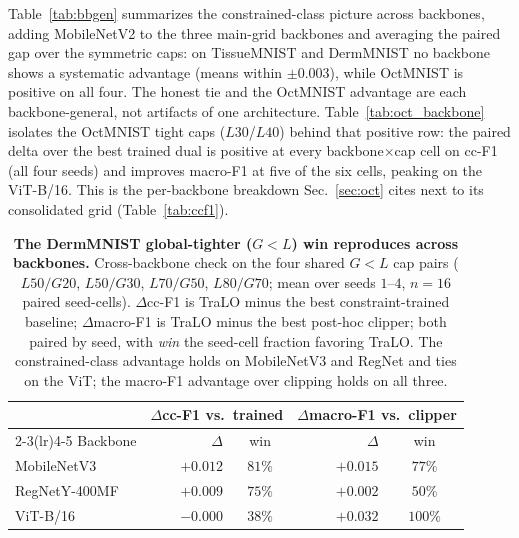 \documentclass[10pt]{article}
\begin{document}
Table~\ref{tab:bbgen} summarizes the constrained-class picture across
backbones, adding MobileNetV2 to the three main-grid backbones and
averaging the paired gap over the symmetric caps: on TissueMNIST and
DermMNIST no backbone shows a systematic advantage (means within
$\pm0.003$), while OctMNIST is positive on all four. The honest tie
and the OctMNIST advantage are each backbone-general, not artifacts of
one architecture. Table~\ref{tab:oct_backbone} isolates the OctMNIST
tight caps ($L30$/$L40$) behind that positive row: the paired delta
over the best trained dual is positive at every backbone$\times$cap
cell on cc-F1 (all four seeds) and improves macro-F1 at five of the
six cells, peaking on the ViT-B/16. This is the per-backbone breakdown
Sec.~\ref{sec:oct} cites next to its consolidated grid
(Table~\ref{tab:ccf1}).





\begin{table}[t]\centering\small
\setlength{\tabcolsep}{5pt}
\caption{\textbf{The DermMNIST global-tighter ($G{<}L$) win reproduces
across backbones.} Cross-backbone check on the four shared $G{<}L$
cap pairs ($L50/G20$, $L50/G30$, $L70/G50$, $L80/G70$; mean over
seeds $1$--$4$, $n{=}16$ paired seed-cells). $\Delta$cc-F1 is TraLO
minus the best constraint-trained baseline; $\Delta$macro-F1 is TraLO
minus the best post-hoc clipper; both paired by seed, with \emph{win}
the seed-cell fraction favoring TraLO. The constrained-class advantage
holds on MobileNetV3 and RegNet and ties on the ViT; the macro-F1
advantage over clipping holds on all three.}
\label{tab:asym_xbackbone}
\setlength{\tabcolsep}{4pt}\small
\begin{tabular}{l rc rc}
\toprule
 & \multicolumn{2}{c}{$\Delta$cc-F1 vs.\ trained} & \multicolumn{2}{c}{$\Delta$macro-F1 vs.\ clipper} \\
\cmidrule(lr){2-3}\cmidrule(lr){4-5}
Backbone & $\Delta$ & win & $\Delta$ & win \\
\midrule
MobileNetV3    & $+0.012$ & $81\%$  & $+0.015$ & $77\%$ \\
RegNetY-400MF  & $+0.009$ & $75\%$  & $+0.002$ & $50\%$ \\
ViT-B/16       & $-0.000$ & $38\%$  & $+0.032$ & $100\%$ \\
\bottomrule
\end{tabular}
\end{table}





\end{document}
